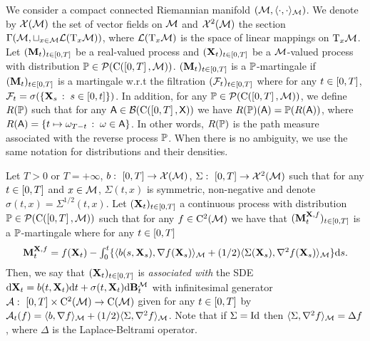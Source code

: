 We consider a compact connected Riemannian manifold
$(\mathcal M, \langle \cdot, \cdot \rangle_\mathcal M)$. We denote by $\mathcal{X}(\mathcal{M})$ the set of vector
fields on $\mathcal M$ and $\mathcal{X}^2(\mathcal{M})$ the section
$\Gamma(\mathcal M, \sqcup_{x \in \mathcal M} \mathcal{L}(\mathrm{T}_x \mathcal M))$, where $\mathcal{L}(\mathrm{T}_x \mathcal M)$ is the space of linear mappings on
$\mathrm{T}_x \mathcal M$. Let $(\mathbf{M}_t)_{t \in \left[0,T\right]}$ be a real-valued process
and $(\mathbf{X}_t)_{t \in \left[0,T\right]}$ be a $\mathcal M$-valued process with distribution
$\mathbb{P} \in \mathcal{P}(\mathrm{C}(\left[0,T\right], \mathcal M))$.  $(\mathbf{M}_t)_{t \in \left[0,T\right]}$ is a
$\mathbb{P}$-martingale if $(\mathbf{M}_t)_{t \in \left[0,T\right]}$ is a martingale w.r.t the
filtration $(\mathcal{F}_t)_{t \in \left[0,T\right]}$ where for any $t \in \left[0,T\right]$,
$\mathcal{F}_t = \sigma(\{\mathbf{X}_s\,:\; s \in \left[0,t\right]\})$. In addition, for
any $\mathbb{P} \in \mathcal{P}(\mathrm{C}(\left[0,T\right], \mathcal M))$, we define $R(\mathbb{P})$ such that for
any $\mathsf{A} \in \mathcal{B}(\mathrm{C}(\left[0,T\right], \mathsf{X}))$ we have
$R(\mathbb{P})(\mathsf{A}) = \mathbb{P}(R(\mathsf{A}))$, where
$R(\mathsf{A}) = \{t \mapsto \omega_{T-t}\,:\; \omega \in \mathsf{A}\}$. In other
words, $R(\mathbb{P})$ is the path measure associated with the reverse process $\mathbb{P}$.
When there is no ambiguity, we use the same notation for distributions and their
densities.

Let $T > 0$ or $T=+\infty$, $b: \ \left[0,T\right] \to \mathcal{X}(\mathcal{M})$, $\Sigma: \ \left[0,T\right] \to \mathcal{X}^2(\mathcal{M})$
such that for any $t \in \left[0,T\right]$ and $x \in \mathcal M$, $\Sigma(t,x)$ is
symmetric, non-negative and denote $\sigma(t,x) = \Sigma^{1/2}(t,x)$. Let
$(\mathbf{X}_t)_{t \in \left[0,T\right]}$ a continuous process with distribution
$\mathbb{P} \in \mathcal{P}(\mathrm{C}(\left[0,T\right], \mathcal M))$ such that for any $f \in \mathrm{C}^2(\mathcal M)$ we
have that $(\mathbf{M}_t^{\mathbf{X}, f})_{t \in \left[0,T\right]}$ is a $\mathbb{P}$-martingale where
for any $t \in \left[0,T\right]$
  \begin{equation}
    \textstyle{ \mathbf{M}_t^{\mathbf{X}, f} = f(\mathbf{X}_t) - \int_0^t \{ \langle b(s, \mathbf{X}_s), \nabla f(\mathbf{X}_s) \rangle_\mathcal M+ (1/2) \langle \Sigma(\mathbf{X}_s),  \nabla^2 f(\mathbf{X}_s) \rangle_\mathcal M\} \mathrm{d}s  . }
  \end{equation}
  Then, we say that $(\mathbf{X}_t)_{t \in \left[0,T\right]}$ is \emph{associated with} the
  SDE $\mathrm{d} \mathbf{X}_t = b(t, \mathbf{X}_t) \mathrm{d} t + \sigma(t, \mathbf{X}_t) \mathrm{d} \mathbf{B}_t^\mathcal M$
  with infinitesimal generator
  $\mathcal{A}: \ \left[0,T\right] \times \mathrm{C}^2(\mathcal M) \to \mathrm{C}(\mathcal M)$ given for any
  $t \in \left[0,T\right]$ by
  $\mathcal{A}_t( f) = \langle b, \nabla f \rangle_\mathcal M + (1/2) \langle \Sigma,
  \nabla^2 f \rangle_\mathcal M$. Note that if $\Sigma = \operatorname{Id}$ then
  $\langle \Sigma, \nabla^2 f \rangle_\mathcal M = \Delta f$, where $\Delta$ is the
  Laplace-Beltrami operator.

